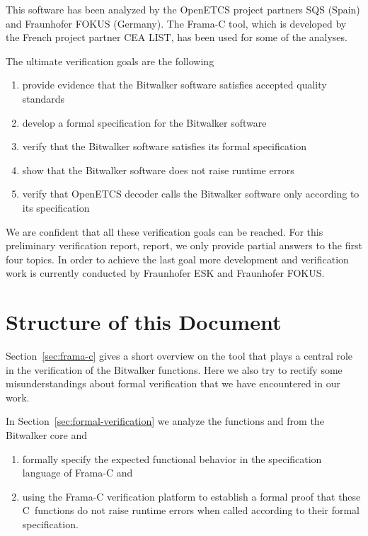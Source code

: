 This software has been analyzed by the OpenETCS project partners SQS (Spain)
and Fraunhofer FOKUS (Germany).
The Frama-C tool, which is developed by the French project partner {CEA LIST},
has been used for some of the analyses.

\clearpage

The ultimate verification goals are the following

\begin{enumerate}
\item provide evidence that the Bitwalker software satisfies 
      accepted quality standards
\item develop a formal specification for the Bitwalker software
\item verify that the Bitwalker software satisfies its formal specification
\item show that the Bitwalker software does not raise runtime errors
\item verify that OpenETCS decoder calls the Bitwalker software only
      according to its specification
\end{enumerate}

We are confident that all these verification goals can be reached.
For this preliminary verification report, report,
we only provide partial answers to the first four topics.
In order to achieve the last goal more development and verification
work is currently conducted by Fraunhofer ESK and Fraunhofer FOKUS. 

\section*{Structure of this Document}

Section~\ref{sec:frama-c} gives a short overview on the \framacwp tool
that plays a central role in the verification of the Bitwalker functions.
Here we also try to rectify some misunderstandings about formal verification
that we have encountered in our work.

In Section~\ref{sec:formal-verification} we analyze
the functions \peek and \poke from the Bitwalker core and
\begin{enumerate}
\item formally specify the
      expected functional behavior in the \acsl specification language of {Frama-C}
      and
\item using the {Frama-C} verification platform to establish a formal proof that these
      C~functions do not raise runtime errors when called according to their
      formal specification.
\end{enumerate}

